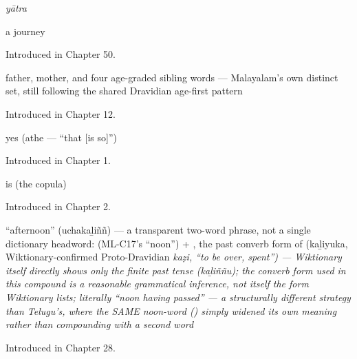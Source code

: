 \noindent\begin{minipage}[t]{\linewidth}
\raggedright
\textbf{}\enspace\emph{yātra}\par
\small a journey\par
\footnotesize Introduced in Chapter 50.
\end{minipage}\par\medskip

\noindent\begin{minipage}[t]{\linewidth}
\raggedright
\textbf{     }\par
\small father, mother, and four age-graded sibling words — Malayalam's own distinct set, still following the shared Dravidian age-first pattern\par
\footnotesize Introduced in Chapter 12.
\end{minipage}\par\medskip

\noindent\begin{minipage}[t]{\linewidth}
\raggedright
\textbf{}\par
\small yes (athe — \textquotedblleft{}that {[}is so{]}\textquotedblright{})\par
\footnotesize Introduced in Chapter 1.
\end{minipage}\par\medskip

\noindent\begin{minipage}[t]{\linewidth}
\raggedright
\textbf{}\par
\small is (the copula)\par
\footnotesize Introduced in Chapter 2.
\end{minipage}\par\medskip

\noindent\begin{minipage}[t]{\linewidth}
\raggedright
\textbf{}\par
\small \textquotedblleft{}afternoon\textquotedblright{} (uchakaḻiññ) — a transparent two-word phrase, not a single dictionary headword:  (ML-C17's \textquotedblleft{}noon\textquotedblright{}) + , the past converb form of  (kaḻiyuka, Wiktionary-confirmed Proto-Dravidian \emph{kaẓi, \textquotedblleft{}to be over, spent\textquotedblright{}) — Wiktionary itself directly shows only the finite past tense  (kaḻiññu); the converb form used in this compound is a reasonable grammatical inference, not itself the form Wiktionary lists; literally \textquotedblleft{}noon having passed\textquotedblright{} — a structurally different strategy than Telugu's, where the SAME noon-word () simply widened its own meaning rather than compounding with a second word}\par
\footnotesize Introduced in Chapter 28.
\end{minipage}\par\medskip

